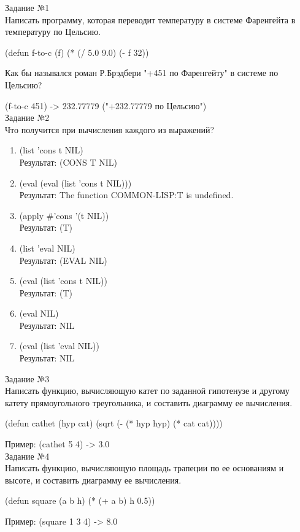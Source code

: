 {\LARGE Задание №1}\\

Написать программу, которая переводит температуру в системе Фаренгейта в температуру по Цельсию.

(defun f-to-c (f) (* (/ 5.0 9.0) (- f 32))

Как бы назывался роман Р.Брэдбери "+451 по Фаренгейту" в системе по Цельсию?

(f-to-c 451) -> 232.77779 ("+232.77779 по Цельсию")\\

{\LARGE Задание №2}\\

Что получится при вычисления каждого из выражений?
\begin{enumerate}
\item (list 'cons t NIL)\\
Результат: (CONS T NIL)
\item (eval (eval (list 'cons t NIL)))\\
Результат: The function COMMON-LISP:T is undefined.
\item (apply \#'cons '(t NIL))\\
Результат: (T)
\item (list 'eval NIL)\\
Результат: (EVAL NIL)
\item (eval (list 'cons t NIL))\\
Результат: (T)
\item (eval NIL)\\
Результат: NIL
\item (eval (list 'eval NIL))\\
Результат: NIL\\
\end{enumerate}

{\LARGE Задание №3}\\

Написать функцию, вычисляющую катет по заданной гипотенузе и другому катету прямоугольного треугольника, и составить диаграмму ее вычисления.

(defun cathet (hyp cat) (sqrt (- (* hyp hyp) (* cat cat))))

Пример: (cathet 5 4) -> 3.0\\

{\LARGE Задание №4}\\

Написать функцию, вычисляющую площадь трапеции по ее основаниям и высоте, и составить диаграмму ее вычисления.

(defun square (a b h) (* (+ a b) h 0.5))

Пример: (square 1 3 4) -> 8.0

